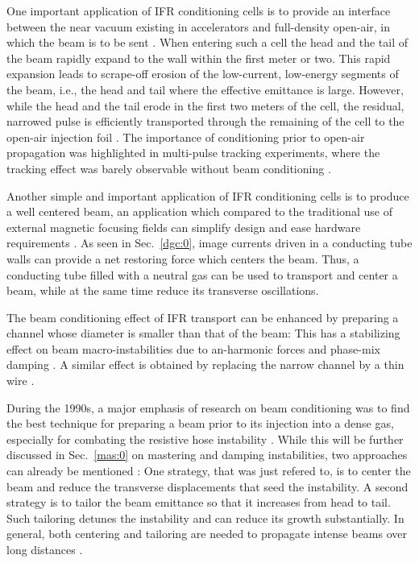 \documentclass [12pt,a4paper,     ]{report} %
\begin{document}
   One important application of IFR conditioning cells is to provide an interface between the near vacuum existing in accelerators and full-density open-air, in which the beam is to be sent \cite{EKDAH1986-}.  When entering such a cell the head and the tail of the beam rapidly expand to the wall within the first meter or two. This rapid expansion leads to scrape-off erosion of the low-current, low-energy segments of the beam, i.e., the head and tail where the effective emittance is large.  However, while the head and the tail erode in the first two meters of the cell, the residual, narrowed pulse is efficiently transported through the remaining of the cell to the open-air injection foil \cite[p.12--14]{EKDAH1986-}.  The importance of conditioning prior to open-air propagation was highlighted in multi-pulse tracking experiments, where the tracking effect was barely observable without beam conditioning \cite{MURPH1992-}.


   Another simple and important application of IFR conditioning cells is to produce a well centered beam, an application which compared to the traditional use of external magnetic focusing fields can simplify design and ease hardware requirements \cite{MYERS1995-}.  As seen in Sec.~\ref{dgc:0}, image currents driven in a conducting tube walls can provide a net restoring force which centers the beam.  Thus, a conducting tube filled with a neutral gas can be used to transport and center a beam, while at the same time reduce its transverse oscillations.  

   The beam conditioning effect of IFR transport can be enhanced by preparing a channel whose diameter is smaller than that of the beam: This has a stabilizing effect on beam macro-instabilities due to an-harmonic forces and phase-mix damping \cite{DIDEN1977-, CAPOR1986-}.  A similar effect is obtained by replacing the narrow channel by a thin wire \cite{DIDEN1977-,PRONO1983-}.
 
  During the 1990s, a major emphasis of research on beam conditioning was to find the best technique for preparing a beam prior to its injection into a dense gas, especially for combating the resistive hose instability \cite{FERNS1992-, HUBBA1993-, WEIDM1994-, MURPH1996-, ROSE-2001B}.  While this will be further discussed in Sec.~\ref{mas:0} on mastering and damping instabilities, two approaches can already be mentioned \cite{FERNS1992-}:  One strategy, that was just refered to, is to center the beam and reduce the transverse displacements that seed the instability.  A second strategy is to tailor the beam emittance so that it increases from head to tail.  Such tailoring detunes the instability and can reduce its growth substantially.  In general, both centering and tailoring are needed to propagate intense beams over long distances \cite{FERNS1992-, HUBBA1993-}.
\end{document}
